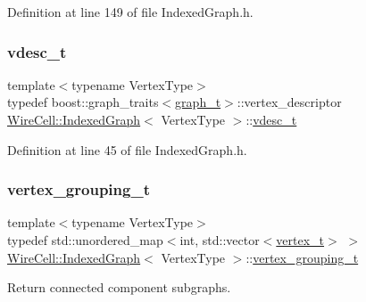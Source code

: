 Definition at line 149 of file Indexed\+Graph.\+h.

\mbox{\label{class_wire_cell_1_1_indexed_graph_a8bad4d4e6f2d8a8109e95757d502c9ba}} 
\subsubsection{\texorpdfstring{vdesc\+\_\+t}{vdesc\_t}}
{\footnotesize\ttfamily template$<$typename Vertex\+Type$>$ \\
typedef boost\+::graph\+\_\+traits$<$\hyperlink{class_wire_cell_1_1_indexed_graph_a5593f08e4be84de33ebf37de7d071819}{graph\+\_\+t}$>$\+::vertex\+\_\+descriptor \hyperlink{class_wire_cell_1_1_indexed_graph}{Wire\+Cell\+::\+Indexed\+Graph}$<$ Vertex\+Type $>$\+::\hyperlink{class_wire_cell_1_1_indexed_graph_a8bad4d4e6f2d8a8109e95757d502c9ba}{vdesc\+\_\+t}}



Definition at line 45 of file Indexed\+Graph.\+h.

\mbox{\label{class_wire_cell_1_1_indexed_graph_af5e6a57c2c26d4f3036745cfe73a8a98}} 
\subsubsection{\texorpdfstring{vertex\+\_\+grouping\+\_\+t}{vertex\_grouping\_t}}
{\footnotesize\ttfamily template$<$typename Vertex\+Type$>$ \\
typedef std\+::unordered\+\_\+map$<$int, std\+::vector$<$\hyperlink{class_wire_cell_1_1_indexed_graph_ac26b25ac103373dde929a982d948d1b5}{vertex\+\_\+t}$>$ $>$ \hyperlink{class_wire_cell_1_1_indexed_graph}{Wire\+Cell\+::\+Indexed\+Graph}$<$ Vertex\+Type $>$\+::\hyperlink{class_wire_cell_1_1_indexed_graph_af5e6a57c2c26d4f3036745cfe73a8a98}{vertex\+\_\+grouping\+\_\+t}}



Return connected component subgraphs. 



